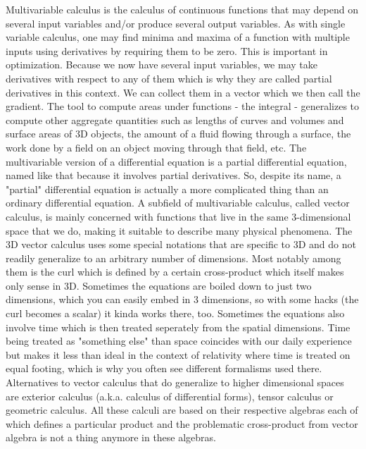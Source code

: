 \documentclass[12pt]{article}
\begin{document}
Multivariable calculus is the calculus of continuous functions that may depend on several input variables and/or produce several output variables. As with single variable calculus, one may find minima and maxima of a function with multiple inputs using derivatives by requiring them to be zero. This is important in optimization. Because we now have several input variables, we may take derivatives with respect to any of them which is why they are called partial derivatives in this context. We can collect them in a vector which we then call the gradient. The tool to compute areas under functions - the integral - generalizes to compute other aggregate quantities such as lengths of curves and volumes and surface areas of 3D objects, the amount of a fluid flowing through a surface, the work done by a field on an object moving through that field, etc. The multivariable version of a differential equation is a partial differential equation, named like that because it involves partial derivatives. So, despite its name, a "partial" differential equation is actually a more complicated thing than an ordinary differential equation. A subfield of multivariable calculus, called vector calculus, is mainly concerned with functions that live in the same 3-dimensional space that we do, making it suitable to describe many physical phenomena. The 3D vector calculus uses some special notations that are specific to 3D and do not readily generalize to an arbitrary number of dimensions. Most notably among them is the curl which is defined by a certain cross-product which itself makes only sense in 3D. Sometimes the equations are boiled down to just two dimensions, which you can easily embed in 3 dimensions, so with some hacks (the curl becomes a scalar) it kinda works there, too. Sometimes the equations also involve time which is then treated seperately from the spatial dimensions. Time being treated as "something else" than space coincides with our daily experience but makes it less than ideal in the context of relativity where time is treated on equal footing, which is why you often see different formalisms used there. Alternatives to vector calculus that do generalize to higher dimensional spaces are exterior calculus (a.k.a. calculus of differential forms), tensor calculus or geometric calculus. All these calculi are based on their respective algebras each of which defines a particular product and the problematic cross-product from vector algebra is not a thing anymore in these algebras.

\end{document}

